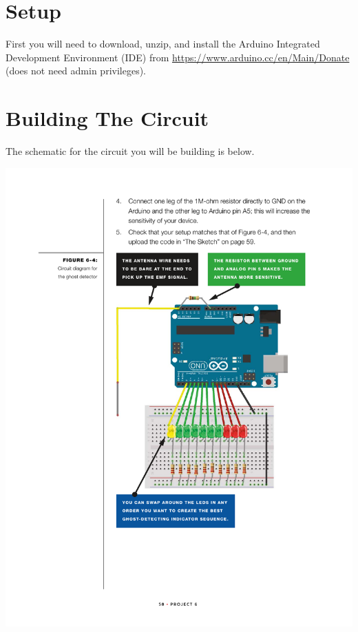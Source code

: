 \documentclass[11pt]{article}
\begin{document}
\section{Setup}
\label{sec:org3b90a27}

First you will need to download, unzip, and install the Arduino Integrated Development Environment (IDE) from
\url{https://www.arduino.cc/en/Main/Donate} (does not need admin privileges).

\section{Building The Circuit}
\label{sec:org7659439}

The schematic for the circuit you will be building is below.

\begin{center}
\includegraphics[width=.9\linewidth]{./exp3-ghost-detector6.pdf}
\end{center}
\end{document}
